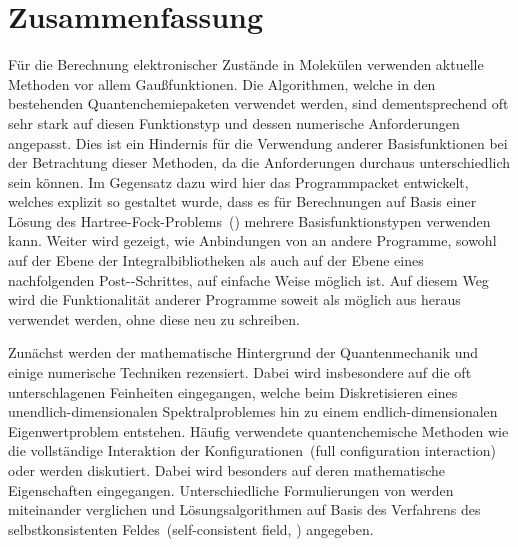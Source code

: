 %
%
\chapter*{Zusammenfassung}
{}

Für die Berechnung elektronischer Zustände in Molekülen
verwenden aktuelle Methoden vor allem Gaußfunktionen.
Die Algorithmen, welche in den bestehenden Quantenchemiepaketen
verwendet werden, sind dementsprechend oft sehr stark
auf diesen Funktionstyp und dessen numerische Anforderungen angepasst.
Dies ist ein Hindernis für die Verwendung
anderer Basisfunktionen bei der Betrachtung dieser Methoden,
da die Anforderungen durchaus unterschiedlich sein können.
Im Gegensatz dazu wird hier
das Programmpacket \molsturm entwickelt,
welches explizit so gestaltet wurde,
dass es für Berechnungen auf Basis einer Lösung des Hartree-Fock-Problems~(\HF)
mehrere Basisfunktionstypen verwenden kann.
Weiter wird gezeigt, wie Anbindungen von \molsturm
an andere Programme,
sowohl auf der Ebene der Integralbibliotheken
als auch auf der Ebene eines nachfolgenden Post-\HF-Schrittes,
auf einfache Weise möglich ist.
Auf diesem Weg wird die Funktionalität anderer Programme
soweit als möglich aus \molsturm heraus verwendet werden,
ohne diese neu zu schreiben.

Zunächst werden der mathematische Hintergrund der Quantenmechanik
und einige numerische Techniken rezensiert.
Dabei wird insbesondere auf die oft unterschlagenen Feinheiten eingegangen,
welche beim Diskretisieren eines unendlich-dimensionalen Spektralproblemes
hin zu einem endlich-dimensionalen Eigenwertproblem entstehen.
Häufig verwendete quantenchemische Methoden
wie die vollständige Interaktion der Konfigurationen~(full configuration interaction)
oder \HF werden diskutiert.
Dabei wird besonders auf deren mathematische Eigenschaften eingegangen.
Unterschiedliche Formulierungen von \HF werden miteinander verglichen
und
Lösungsalgorithmen auf Basis des Verfahrens des
selbstkonsistenten Feldes~(self-consistent field, \SCF) angegeben.

